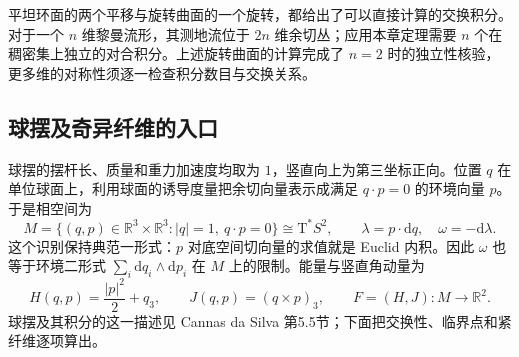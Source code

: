 平坦环面的两个平移与旋转曲面的一个旋转，都给出了可以直接计算的交换积分。对于一个 \(n\) 维黎曼流形，其测地流位于 \(2n\) 维余切丛；应用本章定理需要 \(n\) 个在稠密集上独立的对合积分。上述旋转曲面的计算完成了 \(n=2\) 时的独立性核验，更多维的对称性须逐一检查积分数目与交换关系。

\subsection{球摆及奇异纤维的入口}
\label{g4:subsec:1104:03}
球摆的摆杆长、质量和重力加速度均取为 \(1\)，竖直向上为第三坐标正向。位置 \(q\) 在单位球面上，利用球面的诱导度量把余切向量表示成满足 \(q\cdot p=0\) 的环境向量 \(p\)。于是相空间为
\[
	M=\{(q,p)\in\mathbb R^3\times\mathbb R^3:|q|=1,\ q\cdot p=0\}
	\cong\mathrm{T}^*S^2,
	\qquad \lambda=p\cdot\mathrm{d}q,\quad \omega=-\mathrm{d}\lambda.
\]
这个识别保持典范一形式：\(p\) 对底空间切向量的求值就是 Euclid 内积。因此 \(\omega\) 也等于环境二形式 \(\sum_i\mathrm{d}q_i\wedge\mathrm{d}p_i\) 在 \(M\) 上的限制。能量与竖直角动量为
\begin{equation}\label{g4:eq:1104:spherical-pendulum}
	H(q,p)=\frac{|p|^2}{2}+q_3,
	\qquad J(q,p)=(q\times p)_3,
	\qquad F=(H,J):M\longrightarrow\mathbb R^2.
\end{equation}
球摆及其积分的这一描述见 Cannas da Silva 第5.5节；下面把交换性、临界点和紧纤维逐项算出。\cite[第151--152页]{Cannas2006Symplectic}

